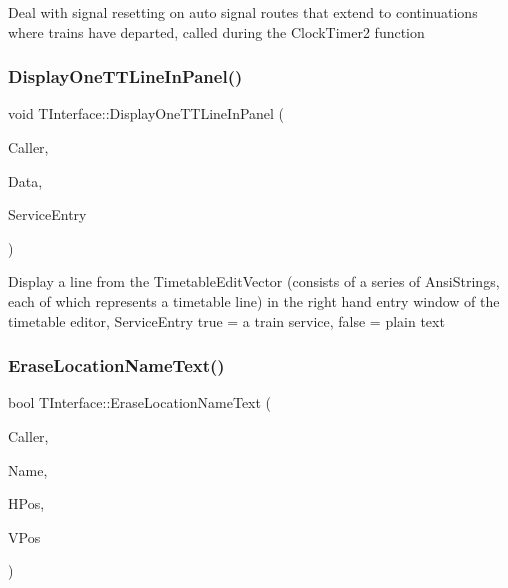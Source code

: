 Deal with signal resetting on auto signal routes that extend to continuations where trains have departed, called during the Clock\+Timer2 function \mbox{\label{class_t_interface_a1181c865da8cea56e6f0af6b31a88db0}} 
\subsubsection{\texorpdfstring{Display\+One\+T\+T\+Line\+In\+Panel()}{DisplayOneTTLineInPanel()}}
{\footnotesize\ttfamily void T\+Interface\+::\+Display\+One\+T\+T\+Line\+In\+Panel (\begin{DoxyParamCaption}\item[{int}]{Caller,  }\item[{Ansi\+String}]{Data,  }\item[{bool}]{Service\+Entry }\end{DoxyParamCaption})\hspace{0.3cm}{\ttfamily [private]}}

Display a line from the Timetable\+Edit\+Vector (consists of a series of Ansi\+Strings, each of which represents a timetable line) in the right hand entry window of the timetable editor, Service\+Entry true = a train service, false = plain text \mbox{\label{class_t_interface_a2bb21fd8e1e90095cf68d63a57e938ec}} 
\subsubsection{\texorpdfstring{Erase\+Location\+Name\+Text()}{EraseLocationNameText()}}
{\footnotesize\ttfamily bool T\+Interface\+::\+Erase\+Location\+Name\+Text (\begin{DoxyParamCaption}\item[{int}]{Caller,  }\item[{Ansi\+String}]{Name,  }\item[{int \&}]{H\+Pos,  }\item[{int \&}]{V\+Pos }\end{DoxyParamCaption})\hspace{0.3cm}{\ttfamily [private]}}

